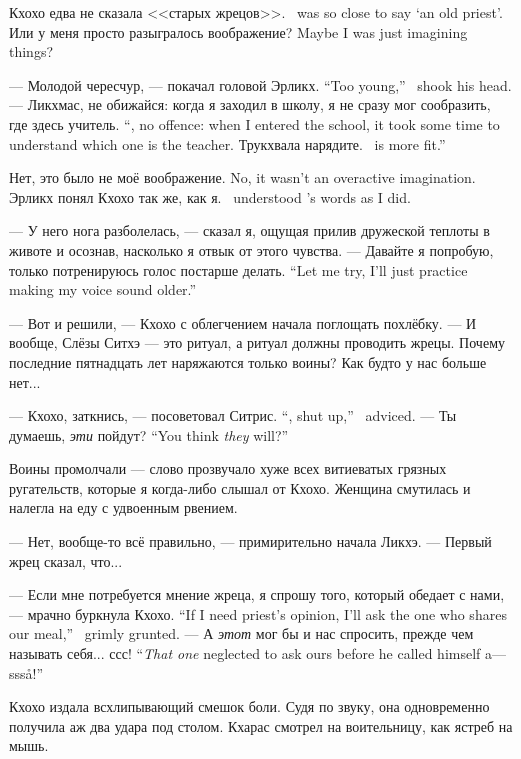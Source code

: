 {Кхохо едва не сказала <<старых жрецов>>.}
{\Kchoho\ was so close to say `an old priest'.}
{Или у меня просто разыгралось воображение?}
{Maybe I was just imagining things?}

{--- Молодой чересчур, --- покачал головой Эрликх.}
{``Too young,'' \Oerlikch\ shook his head.}
{--- Ликхмас, не обижайся: когда я заходил в школу, я не сразу мог сообразить, где здесь учитель.}
{``\Likchmas, no offence: when I entered the school, it took some time to understand which one is the teacher.}
{Трукхвала нарядите.}
{\Trukchual\ is more fit.''}

{Нет, это было не моё воображение.}
{No, it wasn't an overactive imagination.}
{Эрликх понял Кхохо так же, как я.}
{\Oerlikch\ understood \Kchoho's words as I did.}

--- У него нога разболелась, --- сказал я, ощущая прилив дружеской теплоты в животе и осознав, насколько я отвык от этого чувства.
{--- Давайте я попробую, только потренируюсь голос постарше делать.}
{``Let me try, I'll just practice making my voice sound older.''}

--- Вот и решили, --- Кхохо с облегчением начала поглощать похлёбку.
--- И вообще, Слёзы Ситхэ --- это ритуал, а ритуал должны проводить жрецы.
Почему последние пятнадцать лет наряжаются только воины?
Как будто у нас больше нет...

{--- Кхохо, заткнись, --- посоветовал Ситрис.}
{``\Kchoho, shut up,'' \Sitris\ adviced.}
{--- Ты думаешь, \emph{эти} пойдут?}
{``You think \emph{they} will?''}

Воины промолчали --- слово прозвучало хуже всех витиеватых грязных ругательств, которые я когда-либо слышал от Кхохо.
Женщина смутилась и налегла на еду с удвоенным рвением.

--- Нет, вообще-то всё правильно, --- примирительно начала Ликхэ.
--- Первый жрец сказал, что...

{--- Если мне потребуется мнение жреца, я спрошу того, который обедает с нами, --- мрачно буркнула Кхохо.}
{``If I need priest's opinion, I'll ask the one who shares our meal,'' \Kchoho\ grimly grunted.}
{--- А \emph{этот} мог бы и нас спросить, прежде чем называть себя... ссс!}
{``\emph{That one} neglected to ask ours before he called himself a---sss\r{a}!''}

Кхохо издала всхлипывающий смешок боли.
Судя по звуку, она одновременно получила аж два удара под столом.
Кхарас смотрел на воительницу, как ястреб на мышь.


